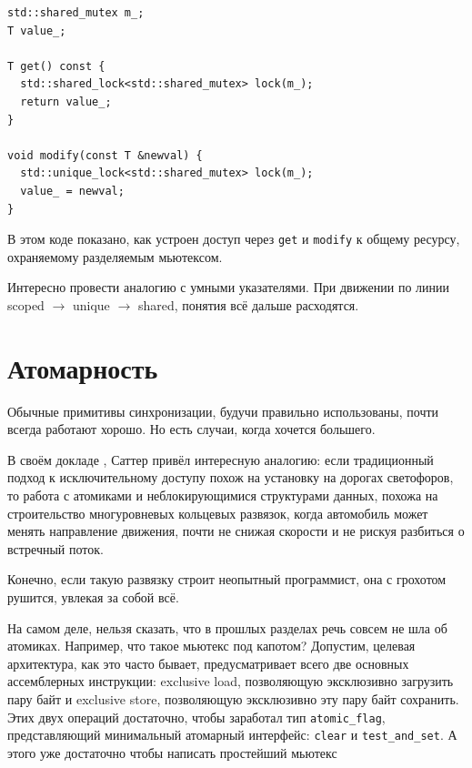 \documentclass[a4paper,12pt,oneside]{book}
\newif\ifmulti
\begin{document}
\begin{lstlisting}
std::shared_mutex m_;
T value_;

T get() const {
  std::shared_lock<std::shared_mutex> lock(m_);
  return value_;
}
 
void modify(const T &newval) {
  std::unique_lock<std::shared_mutex> lock(m_);
  value_ = newval;
}
\end{lstlisting}
 
В этом коде показано, как устроен доступ через \lstinline!get! и \lstinline!modify! к общему ресурсу, охраняемому разделяемым мьютексом.

Интересно провести аналогию с умными указателями. При движении по линии scoped $\rightarrow$ unique $\rightarrow$ shared, понятия всё дальше расходятся.

\ifmulti

TODO: иерархические мьютексы?

\fi

\pagebreak
\section{Атомарность}\label{sec:atomicity}

Обычные примитивы синхронизации, будучи правильно использованы, почти всегда работают хорошо. Но есть случаи, когда хочется большего.

В своём докладе \cite{talk:sutter:lockfree}, Саттер привёл интересную аналогию: если традиционный подход к исключительному доступу похож на установку на дорогах светофоров, то работа с атомиками и неблокирующимися структурами данных, похожа на строительство многуровневых кольцевых развязок, когда автомобиль может менять направление движения, почти не снижая скорости и не рискуя разбиться о встречный поток.

Конечно, если такую развязку строит неопытный программист, она с грохотом рушится, увлекая за собой всё.

На самом деле, нельзя сказать, что в прошлых разделах речь совсем не шла об атомиках. Например, что такое мьютекс под капотом? Допустим, целевая архитектура, как это часто бывает, предусматривает всего две основных ассемблерных инструкции: exclusive load, позволяющую эксклюзивно загрузить пару байт и exclusive store, позволяющую эксклюзивно эту пару байт сохранить. Этих двух операций достаточно, чтобы заработал тип \lstinline!atomic_flag!, представляющий минимальный атомарный интерфейс: \lstinline!clear! и \lstinline!test_and_set!. А этого уже достаточно чтобы написать простейший мьютекс
\end{document}
